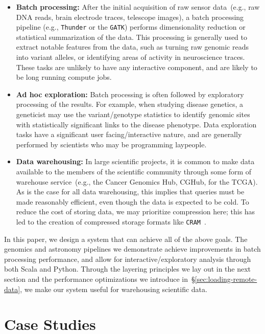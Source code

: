 \documentclass{sig-alternate}
\begin{document}
\begin{itemize}
\item \textbf{Batch processing:} After the initial acquisition of raw sensor data~(e.g., raw DNA reads,
brain electrode traces, telescope images), a batch processing pipeline (e.g., \texttt{Thunder} or
the \texttt{GATK}) performs dimensionality reduction or statistical summarization of the data. This processing is
generally used to extract notable features from the data, such as turning raw genomic reads into variant
alleles, or identifying areas of activity in neuroscience traces. These tasks are unlikely to have any
interactive component, and are likely to be long running compute jobs.
\item \textbf{Ad hoc exploration:} Batch processing is often followed by
exploratory processing of the results. For example, when studying disease genetics, a geneticist may
use the variant/genotype statistics to identify genomic sites with statistically significant links to the
disease phenotype. Data exploration tasks have a significant user facing/interactive nature, and are
generally performed by scientists who may be programming laypeople.
\item \textbf{Data warehousing:} In large scientific projects, it is common to make data available to the
members of the scientific community through some form of warehouse service~(e.g., the Cancer
Genomics Hub, CGHub, for the TCGA). As is the case for all data warehousing, this implies that queries
must be made reasonably efficient, even though the data is expected to be cold. To reduce the cost of
storing data, we may prioritize compression here; this has led to the creation of compressed storage
formats like \texttt{CRAM}~\cite{fritz11}.
\end{itemize}

In this paper, we design a system that can achieve all of the above goals. The genomics and
astronomy pipelines we demonstrate achieve improvements in batch processing performance, and
allow for interactive/exploratory analysis through both Scala and Python. Through the layering principles
we lay out in the next section and the performance optimizations we introduce
in~\S\ref{sec:loading-remote-data}, we make our system useful for warehousing scientific data.

\section{Case Studies}
\label{sec:case-studies}
\end{document}
